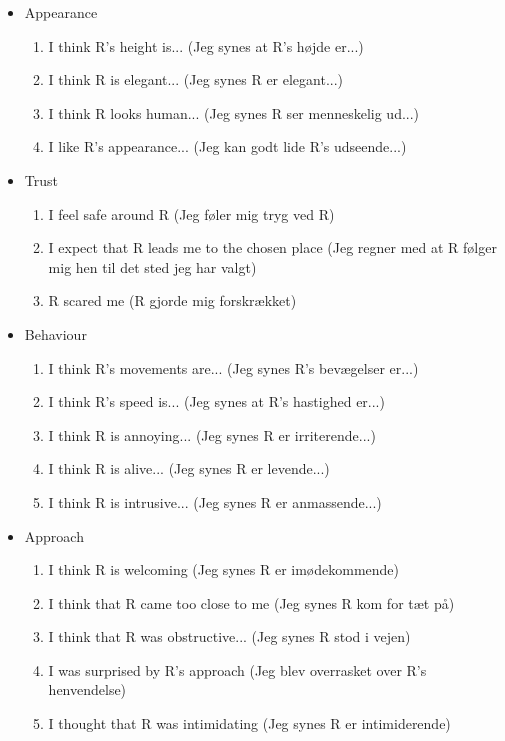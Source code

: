 \begin{itemize}
\item Appearance
\begin{enumerate}
  \item I think R's height is... (Jeg synes at R's højde er...)
  \item I think R is elegant... (Jeg synes R er elegant...)
  \item I think R looks human... (Jeg synes R ser menneskelig ud...)
  \item I like R's appearance... (Jeg kan godt lide R's udseende...)\\
\end{enumerate}
\item Trust 
\begin{enumerate}
  \item I feel safe around R (Jeg føler mig tryg ved R)
  \item I expect that R leads me to the chosen place (Jeg regner med at R følger mig hen til det sted jeg har valgt)
  \item R scared me (R gjorde mig forskrækket)\\
\end{enumerate}
\item Behaviour
\begin{enumerate}
  \item I think R's movements are... (Jeg synes R's bevægelser er...)
  \item I think R's speed is... (Jeg synes at R's hastighed er...)
  \item I think R is annoying... (Jeg synes R er irriterende...)
  \item I think R is alive... (Jeg synes R er levende...)
  \item I think R is intrusive... (Jeg synes R er anmassende...)\\
\end{enumerate}
\item Approach 
\begin{enumerate}
  \item I think R is welcoming (Jeg synes R er imødekommende)
  \item I think that R came too close to me (Jeg synes R kom for tæt på)
  \item I think that R was obstructive... (Jeg synes R stod i vejen)
  \item I was surprised by R's approach (Jeg blev overrasket over R's henvendelse)
  \item I thought that R was intimidating (Jeg synes R er intimiderende)\\
\end{enumerate}
\end{itemize}
